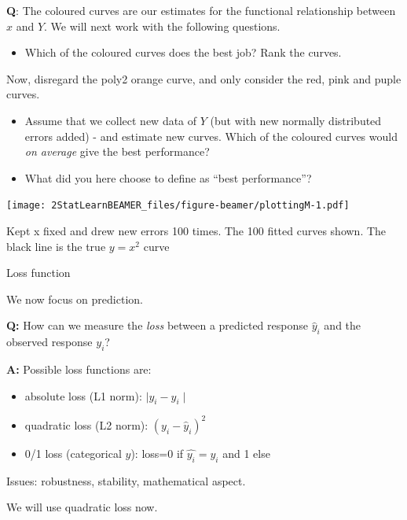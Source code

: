 \documentclass[ignorenonframetext,]{beamer}
\providecommand{\tightlist}{%
  \setlength{\itemsep}{0pt}\setlength{\parskip}{0pt}}
\begin{document}
\begin{frame}

\textbf{Q}: The coloured curves are our estimates for the functional
relationship between \(x\) and \(Y\). We will next work with the
following questions.

\begin{itemize}
\tightlist
\item
  Which of the coloured curves does the best job? Rank the curves.
\end{itemize}

Now, disregard the poly2 orange curve, and only consider the red, pink
and puple curves.

\begin{itemize}
\tightlist
\item
  Assume that we collect new data of \(Y\) (but with new normally
  distributed errors added) - and estimate new curves. Which of the
  coloured curves would \emph{on average} give the best performance?
\item
  What did you here choose to define as ``best performance''?
\end{itemize}

\end{frame}

\begin{frame}

\texttt{[image: 2StatLearnBEAMER\_files/figure-beamer/plottingM-1.pdf]}

Kept x fixed and drew new errors 100 times. The 100 fitted curves shown.
The black line is the true \(y=x^2\) curve

\end{frame}

\begin{frame}

\begin{block}{Loss function}

We now focus on prediction.

\textbf{Q:} How can we measure the \emph{loss} between a predicted
response \(\hat{y}_i\) and the observed response \(y_i\)?

\textbf{A:} Possible loss functions are:

\begin{itemize}
\tightlist
\item
  absolute loss (L1 norm): \(\mid y_i-\hat{y}_i\mid\)
\item
  quadratic loss (L2 norm): \((y_i-\hat{y}_i)^2\)
\item
  0/1 loss (categorical \(y\)): loss=0 if \(\hat{y_i}=y_i\) and 1 else
\end{itemize}

Issues: robustness, stability, mathematical aspect.

We will use quadratic loss now.

\end{block}

\end{frame}
\end{document}
